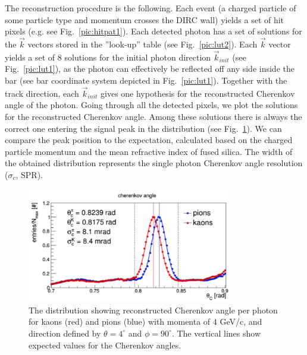 \documentclass[11pt, a4paper]{article}
\begin{document}
The reconstruction procedure is the following. Each event (a charged particle of some particle type and momentum crosses the DIRC wall) yields a set of hit pixels (e.g. see Fig.~\ref{pic:hitpat1}). Each detected photon has a set of solutions for the $\vec k$ vectors stored in the ''look-up'' table (see Fig.~\ref{pic:lut2}). 
Each $\vec k$ vector yields a set of $8$ solutions for the initial photon direction $\vec k_{init}$ (see Fig.~\ref{pic:lut1}), as the photon can effectively be reflected off any side inside the bar (see bar coordinate system depicted in Fig.~\ref{pic:lut1}).
Together with the track direction, each $\vec k_{init}$ gives one hypothesis for the reconstructed Cherenkov angle of the photon. Going through all the detected pixels, we plot the solutions for the reconstructed Cherenkov angle. Among these solutions there is always the correct one entering the signal peak in the distribution (see Fig.~\ref{pic:spr}). 
We can compare the peak position to the expectation, calculated based on the charged particle momentum and the mean refractive index of fused silica. The width of the obtained distribution represents the single photon Cherenkov angle resolution ($\sigma_{c}$, SPR).

\begin{figure}[!h]
\centering
\includegraphics[width=0.8\textwidth]{pics/spr.png}
\caption{\label{pic:spr}
The distribution showing reconstructed Cherenkov angle per photon for kaons (red) and pions (blue) with momenta of $4$ GeV/c, and direction defined by $\theta = 4^{\circ}$ and $\phi = 90^{\circ}$. The vertical lines show expected values for the Cherenkov angles. 
}
\end{figure}
\end{document}
